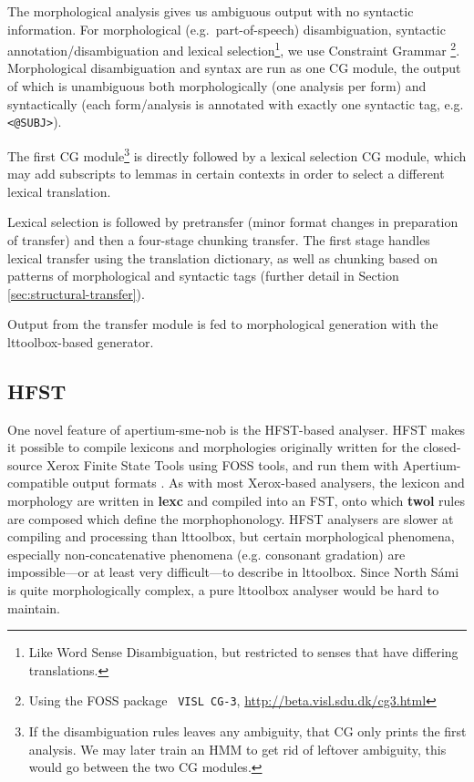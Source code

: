 \documentclass{book}
\begin{document}
The morphological analysis gives us ambiguous output with no syntactic
information. For morphological (e.g.~part-of-speech) disambiguation,
syntactic annotation/disambiguation and lexical
selection\footnote{Like Word Sense Disambiguation, but restricted to
  senses that have differing translations.}, we use Constraint Grammar
\citep{karlsson1990cgf}\footnote{Using the FOSS package {\tt \small
    VISL CG-3},
  \href{http://beta.visl.sdu.dk/cg3.html}{http://beta.visl.sdu.dk/cg3.html}}.
Morphological disambiguation and syntax are run as one CG module, the
output of which is unambiguous both morphologically (one analysis per
form) and syntactically (each form/analysis is annotated with exactly
one syntactic tag, e.g. \texttt{<@SUBJ>}).

The first CG module\footnote{If the disambiguation rules leaves any
  ambiguity, that CG only prints the first analysis. We may later
  train an HMM to get rid of leftover ambiguity, this would go between
  the two CG modules.} is directly followed by a lexical selection CG
module, which may add subscripts to lemmas in certain contexts in
order to select a different lexical translation.

Lexical selection is followed by pretransfer (minor format changes in
preparation of transfer) and then a four-stage chunking transfer. The
first stage handles lexical transfer using the translation dictionary,
as well as chunking based on patterns of morphological and syntactic
tags (further detail in Section \ref{sec:structural-transfer}).

Output from the transfer module is fed to morphological generation
with the lttoolbox-based \nob{} generator.

\subsection{HFST}
\label{sec:hfst}
One novel feature of apertium-sme-nob is the HFST-based analyser. HFST
makes it possible to compile lexicons and morphologies originally
written for the closed-source Xerox Finite State Tools using FOSS
tools, and run them with Apertium-compatible output formats
\citep{pirinen2011compiling}. As with most Xerox-based analysers, the
\sme{} lexicon and morphology are written in \textbf{lexc} and
compiled into an FST, onto which \textbf{twol} rules are composed
which define the morphophonology. HFST analysers are slower at
compiling and processing than lttoolbox, but certain morphological
phenomena, especially non-concatenative phenomena (e.g. \sme{}
consonant gradation) are impossible---or at least very difficult---to
describe in lttoolbox. Since North S\'{a}mi is quite morphologically
complex, a pure lttoolbox analyser would be hard to maintain.
\end{document}
